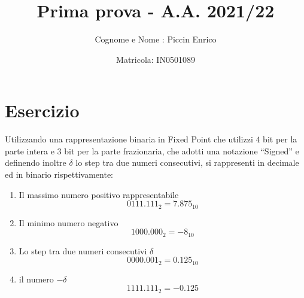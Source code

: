 \documentclass[a4paper]{extarticle}
\title{\textbf{Prima prova - A.A. 2021/22\\}}
\author{Cognome e Nome : Piccin Enrico}
\date{Matricola: IN0501089}
\newcommand{\quotes}[1]{``#1''}
\begin{document}
\vspace{-10mm}
\maketitle

\noindent
\section{Esercizio}
Utilizzando una rappresentazione binaria in Fixed Point che utilizzi $4$ bit per la parte intera e $3$ bit per la parte frazionaria, che adotti una notazione \quotes{Signed} e definendo inoltre $\delta$ lo step tra due numeri consecutivi, si rappresenti in decimale ed in binario rispettivamente:
\begin{enumerate}
    \item Il massimo numero positivo rappresentabile
    \[0111.111_2 = 7.875_{10}\]
    \item Il minimo numero negativo
    \[1000.000_2 = -8_{10}\]
    \item Lo step tra due numeri consecutivi $\delta$
    \[0000.001_2 = 0.125_{10}\]
    \item il numero $-\delta$
    \[1111.111_2 = -0.125\]
\end{enumerate}

\noindent
\end{document}

